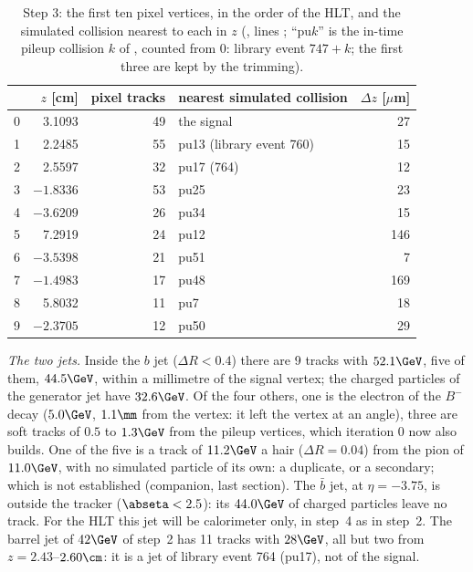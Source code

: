 \begin{table}[!htb]
\centering\small
\caption{Step 3: the first ten pixel vertices, in the order of the HLT, and the simulated collision nearest to each in
$z$ (, lines ; ``pu$k$'' is the in-time pileup collision $k$ of
, counted from 0: library event $747+k$; the first three are kept by the trimming).}
\label{tab:13_vertices}
\begin{tabular}{r rrl r}
\toprule
& $z$ [cm] & pixel tracks & nearest simulated collision & $\Delta z$ [$\mu$m] \\
\midrule
0 & 3.1093 & 49 & the signal & 27 \\
1 & 2.2485 & 55 & pu13 (library event 760) & 15 \\
2 & 2.5597 & 32 & pu17 (764) & 12 \\
3 & $-1.8336$ & 53 & pu25 & 23 \\
4 & $-3.6209$ & 26 & pu34 & 15 \\
5 & 7.2919 & 24 & pu12 & 146 \\
6 & $-3.5398$ & 21 & pu51 & 7 \\
7 & $-1.4983$ & 17 & pu48 & 169 \\
8 & 5.8032 & 11 & pu7 & 18 \\
9 & $-2.3705$ & 12 & pu50 & 29 \\
\bottomrule
\end{tabular}
\end{table}

\emph{The two jets.} Inside the $b$ jet ($\Delta R<0.4$) there are 9 tracks with $52.1\GeV$, five of them, $44.5\GeV$,
within a millimetre of the signal vertex; the charged particles of the generator jet have $32.6\GeV$. Of the four
others, one is the electron of the $B^-$ decay ($5.0\GeV$, $1.1\mm$ from the vertex: it left the vertex at an angle),
three are soft tracks of $0.5$ to $1.3\GeV$ from the pileup vertices, which iteration 0 now also builds. One of the
five is a track of $11.2\GeV$ a hair ($\Delta R=0.04$) from the pion of $11.0\GeV$, with no simulated particle of its
own: a duplicate, or a secondary; which is not established (companion, last section). The $\bar b$ jet, at
$\eta=-3.75$, is outside the tracker ($\abseta<2.5$): its $44.0\GeV$ of charged particles leave no track. For the HLT
this jet will be calorimeter only, in step~4 as in step~2. The barrel jet of $42\GeV$ of step~2 has 11 tracks with
$28\GeV$, all but two from $z=2.43$--$2.60\cm$: it is a jet of library event 764 (pu17), not of the signal.

